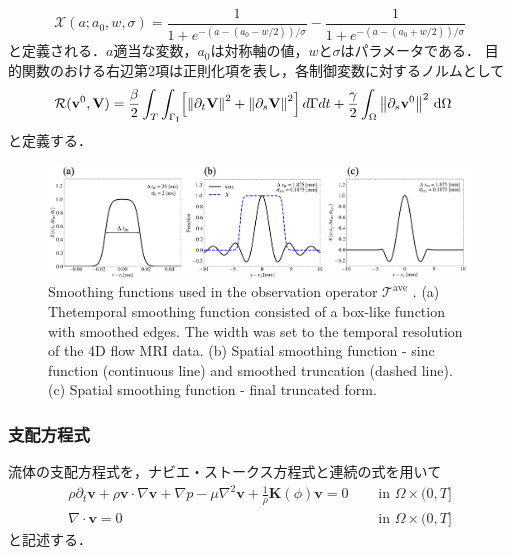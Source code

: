 \begin{equation}
    \mathcal{X}\left(a; a_{0}, w, \sigma\right) 
    = \frac{1}{1+e^{-\left(a - \left(a_{0} - w/2 \right)\right) / \sigma}}-\frac{1}{1+e^{-\left(a - \left(a_{0} + w/2 \right)\right) / \sigma}}
\end{equation}
と定義される．$a$適当な変数，$a_{0}$は対称軸の値，$w$と$\sigma$はパラメータである．
目的関数のおける右辺第2項は正則化項を表し，各制御変数に対するノルムとして
\begin{equation}
    \label{eq:regularization_unsteady}
    \begin{aligned}
    \mathcal{R}(\mathbf{v}^0, \mathbf{V}) 
    &= \frac{\beta}{2} \int_{T}  \int_{\Gamma_\mathrm{I}} \Bigl[\left\|\partial_t{\mathbf{V}}\right\|^2+\left\|\partial_s \mathbf{V}\right\|^2 \Bigr] \, d\Gamma dt
    + \frac{\gamma}{2} \int_{\Omega}  \left\|\partial_s \mathbf{v}^{0} \right\|^2 \, \mathrm{d}\Omega
    \end{aligned}
\end{equation}
と定義する．

\begin{figure}[H]
    \begin{center}
      \includegraphics[width=1.0\textwidth]{figures/smoothing.png}
    \end{center}
    \caption{Smoothing functions used in the observation operator 
    $\mathcal{T}^{\mathrm{ave}}$ \cite{Toger2020}. 
    (a) Thetemporal smoothing function consisted of a box-like function with smoothed edges. 
    The width was set to the temporal resolution of the 4D flow MRI data. 
    (b) Spatial smoothing function - sinc function (continuous line) 
    and smoothed truncation (dashed line). 
    (c) Spatial smoothing function - final truncated form.}
    \label{fig:smoothing}
\end{figure}

\subsubsection{支配方程式}
流体の支配方程式を，ナビエ・ストークス方程式と連続の式を用いて
\begin{equation}
    \label{eq:govering_eq_unsteady}
    \begin{aligned}
    \rho \partial_t \mathbf{v} + \rho \mathbf{v} \cdot \nabla \mathbf{v} + \nabla p - \mu \nabla^2 \mathbf{v} + \frac{1}{\rho} \mathbf{K}(\phi) \mathbf{v} =0 & \hspace{1em} \text { in } \Omega \times (0, T]  \\
    \nabla \cdot \mathbf{v} = \mathrm{0} & \hspace{1em} \text { in } \Omega  \times (0, T] 
    \end{aligned}
\end{equation}
と記述する．

